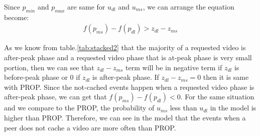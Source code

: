 \documentclass[10pt,final,journal,a4paper]{IEEEtran}
\begin{document}
Since $p_{min}$ and $p_{max}$ are same for $u_{dl}$ and $u_{ms}$, we can arrange the equation become:
\begin{align}\label{eq:dlms_4}
f(p_{ms}) - f(p_{dl}) > z_{dl} - z_{ms}
\end{align}


As we know from table.\ref{tab:stacked2} that the majority of a requested video is after-peak phase and a requested video phase that is  at-peak phase is very small portion, then we can see that $z_{dl} - z_{ms}$ term will be in negative term if $z_{dl}$ is  before-peak phase or $0$ if $z_{dl}$ is  after-peak phase. 
If $z_{dl} - z_{ms}=0$ then it is same with PROP. 
Since the not-cached events happen when a requested video phase is after-peak phase, we can get that $f(p_{ms}) - f(p_{dl}) < 0$.
For the same situation and we compare to the PROP, the probability of $u_{ms}$ less than $u_{dl}$ in the model is higher than PROP. 
Therefore, we can see in the model that the events when a peer does not cache a video are more often than PROP.


\end{document}
